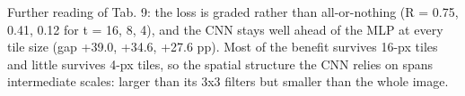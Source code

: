 Further reading of Tab. 9: the loss is graded rather than all-or-nothing (R = 0.75, 0.41, 0.12 for t = 16, 8, 4), and the CNN stays well ahead of the MLP at every tile size (gap +39.0, +34.6, +27.6 pp). Most of the benefit survives 16-px tiles and little survives 4-px tiles, so the spatial structure the CNN relies on spans intermediate scales: larger than its 3x3 filters but smaller than the whole image.
